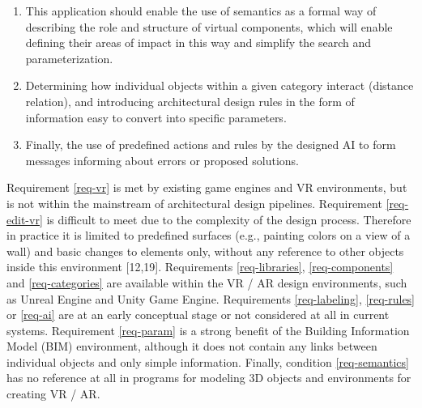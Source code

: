 \documentclass[runningheads]{llncs}
\begin{document}
\begin{enumerate}
\item	\label{req-semantics} This application should enable the use of semantics as a formal way of describing the role and structure of virtual components, which will enable defining their areas of impact in this way and simplify the search and parameterization.\\

\item	\label{req-rules} Determining how individual objects within a given category interact (distance relation), and introducing architectural design rules in the form of information easy to convert into specific parameters.\\

\item 	\label{req-ai} Finally, the use of predefined actions and rules by the designed AI to form messages informing about errors or proposed solutions.\\
\end{enumerate}

Requirement \ref{req-vr} is met by existing game engines and VR environments, but is not within the mainstream of architectural design pipelines. Requirement \ref{req-edit-vr} is difficult to meet due to the complexity of the design process. Therefore in practice it is limited to predefined surfaces (e.g., painting colors on a view of a wall) and basic changes to elements only, without any reference to other objects inside this environment [12,19]. Requirements \ref{req-libraries}, \ref{req-components} and \ref{req-categories} are available within the VR / AR design environments, such as Unreal Engine and Unity  Game Engine. Requirements \ref{req-labeling}, \ref{req-rules} or \ref{req-ai} are at an early conceptual stage or not considered at all in current systems. Requirement \ref{req-param} is a strong benefit of the Building Information Model (BIM) environment, although it does not contain any links between individual objects and only simple information. Finally, condition \ref{req-semantics} has no reference at all in programs for modeling 3D objects and environments for creating VR / AR.
\end{document}
